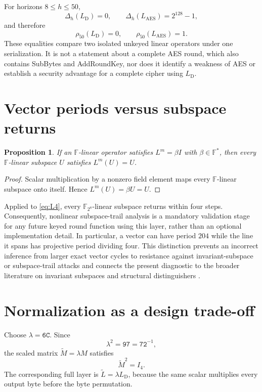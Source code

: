 \documentclass[10pt,reqno]{amsart}
\theoremstyle{plain}
\newtheorem{proposition}[theorem]{Proposition}
\theoremstyle{remark}\newtheorem{remark}[theorem]{Remark}
\theoremstyle{definition}\newtheorem{definition}[theorem]{Definition}
\newcommand{\F}{\mathbb F}
\newcommand{\hex}[1]{\mathtt{#1}}
\newcommand{\AES}{\mathrm{AES}}
\begin{document}
For horizons $8\le h\le50$,
\[
\Delta_h(L_{\mathrm{D}})=0,
\qquad
\Delta_h(L_{\AES})=2^{128}-1,
\]
and therefore
\[
\rho_{50}(L_{\mathrm{D}})=0,
\qquad
\rho_{50}(L_{\AES})=1.
\]
These equalities compare two isolated unkeyed linear operators under one serialization. It is not a statement about a complete AES round, which also contains SubBytes and AddRoundKey, nor does it identify a weakness of AES or establish a security advantage for a complete cipher using $L_{\mathrm{D}}$.

\section{Vector periods versus subspace returns}
\begin{proposition}\label{prop:subspace}
If an $\F$-linear operator satisfies $L^m=\beta I$ with $\beta\in\F^*$, then every $\F$-linear subspace $U$ satisfies $L^m(U)=U$.
\end{proposition}
\begin{proof}
Scalar multiplication by a nonzero field element maps every $\F$-linear subspace onto itself. Hence $L^m(U)=\beta U=U$. \end{proof}

Applied to \eqref{eq:L4}, every $\F_{2^8}$-linear subspace returns within four steps. Consequently, nonlinear subspace-trail analysis is a mandatory validation stage for any future keyed round function using this layer, rather than an optional implementation detail. In particular, a vector can have period $204$ while the line it spans has projective period dividing four. This distinction prevents an incorrect inference from larger exact vector cycles to resistance against invariant-subspace or subspace-trail attacks and connects the present diagnostic to the broader literature on invariant subspaces and structural distinguishers \cite{BeierleCanteaut2017}.

\section{Normalization as a design trade-off}
Choose $\lambda=\hex{6C}$. Since
\[
\lambda^2=\hex{97}=\hex{72}^{-1},
\]
the scaled matrix $\widetilde M=\lambda M$ satisfies
\[
\widetilde M^2=I_4.
\]
The corresponding full layer is $\widetilde L=\lambda L_{\mathrm{D}}$, because the same scalar multiplies every output byte before the byte permutation.
\end{document}
